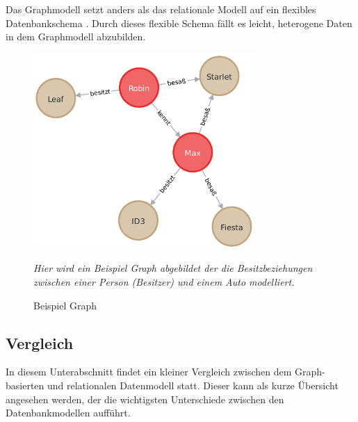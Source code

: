 Das Graphmodell setzt anders als das relationale Modell auf ein flexibles Datenbankschema \cite{gdbms}. Durch dieses flexible Schema fällt es leicht, heterogene Daten in dem Graphmodell abzubilden. 

\begin{figure}[ht]
    \centering
    \includegraphics[width=0.75\textwidth]{images/example_graph.pdf}
    \caption{Beispiel Graph}
    \vspace{1em}
    \textit{Hier wird ein Beispiel Graph abgebildet der die Besitzbeziehungen zwischen einer Person (Besitzer) und einem Auto modelliert.}
    \label{fig:beispiel_graph}
\end{figure}

\subsection{Vergleich}
In diesem Unterabschnitt findet ein kleiner Vergleich zwischen dem Graph-basierten und relationalen Datenmodell statt. Dieser kann als kurze Übersicht angesehen werden, der die wichtigsten Unterschiede zwischen den Datenbankmodellen aufführt. 

